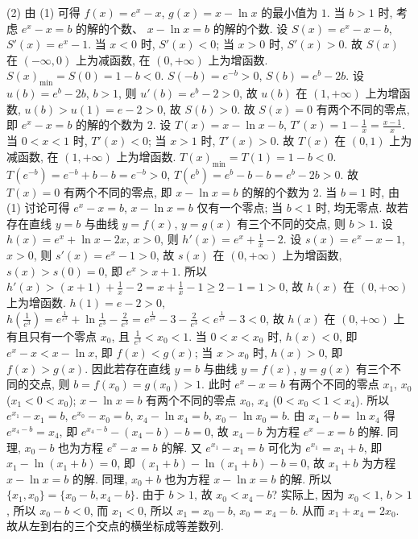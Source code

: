 \begin{question}[points=12]
\begin{solution}
(2) 由 (1) 可得 $f(x) = e^x - x$, $g(x) = x - \ln x$ 的最小值为 $1$. 当 $b > 1$ 时, 考虑 $e^x - x = b$ 的解的个数、 $x - \ln x = b$ 的解的个数. 设 $S(x) = e^x - x - b$, $S'(x) = e^x - 1$. 当 $x < 0$ 时, $S'(x) < 0$; 当 $x > 0$ 时, $S'(x) > 0$. 故 $S(x)$ 在 $(-\infty, 0)$ 上为减函数, 在 $(0, +\infty)$ 上为增函数. $S(x)_{\min} = S(0) = 1 - b < 0$. $S(-b) = e^{-b} > 0$, $S(b) = e^b - 2b$. 设 $u(b) = e^b - 2b$, $b > 1$, 则 $u'(b) = e^b - 2 > 0$, 故 $u(b)$ 在 $(1, +\infty)$ 上为增函数, $u(b) > u(1) = e - 2 > 0$, 故 $S(b) > 0$. 故 $S(x) = 0$ 有两个不同的零点, 即 $e^x - x = b$ 的解的个数为 2. 设 $T(x) = x - \ln x - b$, $T'(x) = 1 - \frac{1}{x} = \frac{x-1}{x}$. 当 $0 < x < 1$ 时, $T'(x) < 0$; 当 $x > 1$ 时, $T'(x) > 0$. 故 $T(x)$ 在 $(0,1)$ 上为减函数, 在 $(1, +\infty)$ 上为增函数. $T(x)_{\min} = T(1) = 1 - b < 0$. $T(e^{-b}) = e^{-b} + b - b = e^{-b} > 0$, $T(e^b) = e^b - b - b = e^b - 2b > 0$. 故 $T(x) = 0$ 有两个不同的零点, 即 $x - \ln x = b$ 的解的个数为 2. 当 $b = 1$ 时, 由 (1) 讨论可得 $e^x - x = b$, $x - \ln x = b$ 仅有一个零点; 当 $b < 1$ 时, 均无零点. 故若存在直线 $y = b$ 与曲线 $y = f(x)$, $y = g(x)$ 有三个不同的交点, 则 $b > 1$. 设 $h(x) = e^x + \ln x - 2x$, $x > 0$, 则 $h'(x) = e^x + \frac{1}{x} - 2$. 设 $s(x) = e^x - x - 1$, $x > 0$, 则 $s'(x) = e^x - 1 > 0$, 故 $s(x)$ 在 $(0, +\infty)$ 上为增函数, $s(x) > s(0) = 0$, 即 $e^x > x + 1$. 所以 $h'(x) > (x+1) + \frac{1}{x} - 2 = x + \frac{1}{x} - 1 \ge 2 - 1 = 1 > 0$, 故 $h(x)$ 在 $(0, +\infty)$ 上为增函数. $h(1) = e - 2 > 0$, $h(\frac{1}{e^3}) = e^{\frac{1}{e^3}} + \ln\frac{1}{e^3} - \frac{2}{e^3} = e^{\frac{1}{e^3}} - 3 - \frac{2}{e^3} < e^{\frac{1}{e^3}} - 3 < 0$, 故 $h(x)$ 在 $(0, +\infty)$ 上有且只有一个零点 $x_0$, 且 $\frac{1}{e^3} < x_0 < 1$. 当 $0 < x < x_0$ 时, $h(x) < 0$, 即 $e^x - x < x - \ln x$, 即 $f(x) < g(x)$; 当 $x > x_0$ 时, $h(x) > 0$, 即 $f(x) > g(x)$. 因此若存在直线 $y = b$ 与曲线 $y = f(x)$, $y = g(x)$ 有三个不同的交点, 则 $b = f(x_0) = g(x_0) > 1$. 此时 $e^x - x = b$ 有两个不同的零点 $x_1$, $x_0$ ($x_1 < 0 < x_0$); $x - \ln x = b$ 有两个不同的零点 $x_0$, $x_4$ ($0 < x_0 < 1 < x_4$). 所以 $e^{x_1} - x_1 = b$, $e^{x_0} - x_0 = b$, $x_4 - \ln x_4 = b$, $x_0 - \ln x_0 = b$. 由 $x_4 - b = \ln x_4$ 得 $e^{x_4 - b} = x_4$, 即 $e^{x_4 - b} - (x_4 - b) - b = 0$, 故 $x_4 - b$ 为方程 $e^x - x = b$ 的解. 同理, $x_0 - b$ 也为方程 $e^x - x = b$ 的解. 又 $e^{x_1} - x_1 = b$ 可化为 $e^{x_1} = x_1 + b$, 即 $x_1 - \ln(x_1 + b) = 0$, 即 $(x_1 + b) - \ln(x_1 + b) - b = 0$, 故 $x_1 + b$ 为方程 $x - \ln x = b$ 的解. 同理, $x_0 + b$ 也为方程 $x - \ln x = b$ 的解. 所以 $\{x_1, x_0\} = \{x_0 - b, x_4 - b\}$. 由于 $b > 1$, 故 $x_0 < x_4 - b$? 实际上, 因为 $x_0 < 1$, $b > 1$, 所以 $x_0 - b < 0$, 而 $x_1 < 0$, 所以 $x_1 = x_0 - b$, $x_0 = x_4 - b$. 从而 $x_1 + x_4 = 2x_0$. 故从左到右的三个交点的横坐标成等差数列.
\end{solution}
\end{question}

